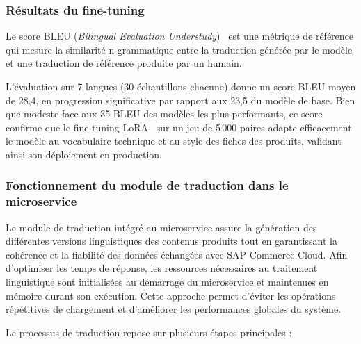 \subsubsection{Résultats du fine-tuning}

Le score BLEU (\textit{Bilingual Evaluation Understudy})~\cite{bleu} est une métrique de référence qui mesure la similarité n-grammatique entre la traduction générée par le modèle et une traduction de référence produite par un humain.

L'évaluation sur 7 langues (30 échantillons chacune) donne un score BLEU moyen de 28,4, en progression significative par rapport aux 23,5 du modèle de base. Bien que modeste face aux 35 BLEU des modèles les plus performants, ce score confirme que le fine-tuning LoRA~\cite{lora} sur un jeu de 5\,000 paires adapte efficacement le modèle au vocabulaire technique et au style des fiches des produits, validant ainsi son déploiement en production.

\subsubsection{Fonctionnement du module de traduction dans le microservice}

Le module de traduction intégré au microservice assure la génération des différentes versions linguistiques des contenus produits tout en garantissant la cohérence et la fiabilité des données échangées avec SAP Commerce Cloud. Afin d'optimiser les temps de réponse, les ressources nécessaires au traitement linguistique sont initialisées au démarrage du microservice et maintenues en mémoire durant son exécution. Cette approche permet d'éviter les opérations répétitives de chargement et d'améliorer les performances globales du système.

Le processus de traduction repose sur plusieurs étapes principales :

